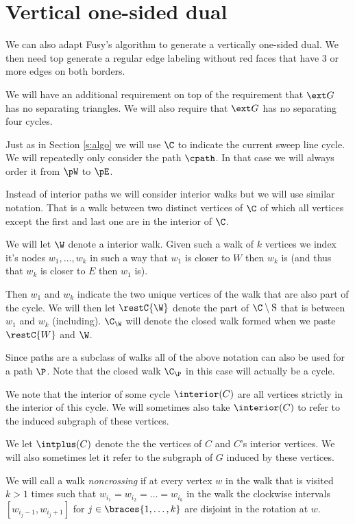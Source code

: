 

\section{Vertical one-sided dual}
\label{s:red}

We can also adapt Fusy's algorithm to generate a vertically one-sided dual. We then need top generate a regular edge labeling without red faces that have $3$ or more edges on both borders.

We will have an additional requirement on top of the requirement that $\ext G$ has no separating triangles. We will also require that $\ext G$ has no separating four cycles.


  Just as in Section \ref{s:algo} we will use $\C$ to indicate the current sweep line cycle.
  We will repeatedly only consider the path $\cpath$. In that case we will always order it from $\pW$ to $\pE$.

  Instead of interior paths we will consider interior walks but we will use similar notation. That is a walk between two distinct vertices of $\C$ of which all vertices except the first and last one are in the interior of $\C$.

  We will let $\W$ denote a interior walk. Given such a walk of $k$ vertices we index it's nodes $w_1, \ldots, w_k$  in such a way that $w_1$ is closer to $W$ then $w_k$ is (and thus that $w_k$ is closer to $E$ then $w_1$ is).

  Then $w_1$ and $w_k$ indicate the two unique vertices of the walk that are also part of the cycle. We will then let $\restC{\W}$ denote the part of $\C\setminus {\mathrm{S}}$ that is between $w_1$ and $w_k$ (including). $\C_\W$ will denote the closed walk formed when we paste $\restC{W}$ and $\W$.

  Since paths are a subclass of walks all of the above notation can also be used for a path $\P$. Note that the closed walk $\C_\P$ in this case will actually be a cycle.


  We note that the interior of some cycle $\interior(C)$ are all vertices strictly in the interior of this cycle. We will sometimes also take $\interior(C)$ to refer to the induced subgraph of these vertices.

  We let $\intplus(C)$ denote the the vertices of $C$ and $C$'s interior vertices. We will also sometimes let it refer to the subgraph of $G$ induced by these vertices.

  We will call a walk \emph{noncrossing} if at every vertex $w$ in the walk that is visited $k >1$ times such that $w_{i_1} = w_{i_2} = \ldots = w_{i_k}$ in the walk the clockwise intervals $[w_{i_j-1}, w_{i_j+1}]$ for $j \in \braces {1, \ldots, k}$ are disjoint in the rotation at $w$.

